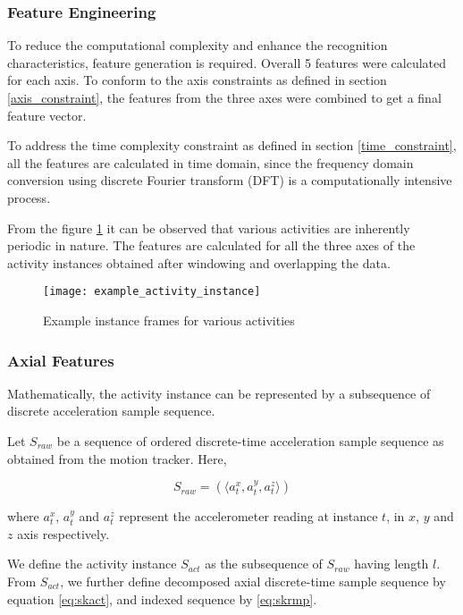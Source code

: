 \documentclass[
10pt,           %
a4paper,        %
oneside,        %
headinclude,footinclude, %
]{scrartcl}
\begin{document}
\subsubsection{Feature Engineering}
To reduce the computational complexity and enhance the recognition characteristics, feature generation is required. Overall 5 features were calculated for each axis. To conform to the axis constraints as defined in section \ref{axis_constraint}, the features from the three axes were combined to get a final feature vector.

To address the time complexity constraint as defined in section \ref{time_constraint}, all the features are calculated in time domain, since the frequency domain conversion using discrete Fourier transform (\gls{DFT}) is a computationally intensive process.

From the figure \ref{example_activity_instance} it can be observed that various activities are inherently periodic in nature. The features are calculated for all the three axes of the activity instances obtained after windowing and overlapping the data.

\begin{figure}[b]
  \begin{center}
    \texttt{[image: example\_activity\_instance]}
  \end{center}
  \vspace{-10pt}
  \caption{\label{example_activity_instance}Example instance frames for various activities}
\end{figure}

\subsubsection{Axial Features}
\label{axial_feature}
Mathematically, the activity instance can be represented by a subsequence of discrete acceleration sample sequence.

Let $S_{raw}$ be a sequence of ordered discrete-time acceleration sample sequence as obtained from the motion tracker. Here, 

\begin{equation} \label{eq:s_raw}
S_{raw}=(\langle a^x_t,a^y_t,a^z_t \rangle)
\end{equation}

where $a^x_t$, $a^y_t$ and $a^z_t$ represent the accelerometer reading at instance $t$, in $x$, $y$ and $z$ axis respectively.

We define the activity instance $S_{act}$ as the subsequence of $S_{raw}$ having length $l$. From $S_{act}$, we further define decomposed axial discrete-time sample sequence by equation \ref{eq:skact}, and indexed sequence by \ref{eq:skrmp}.
\end{document}
